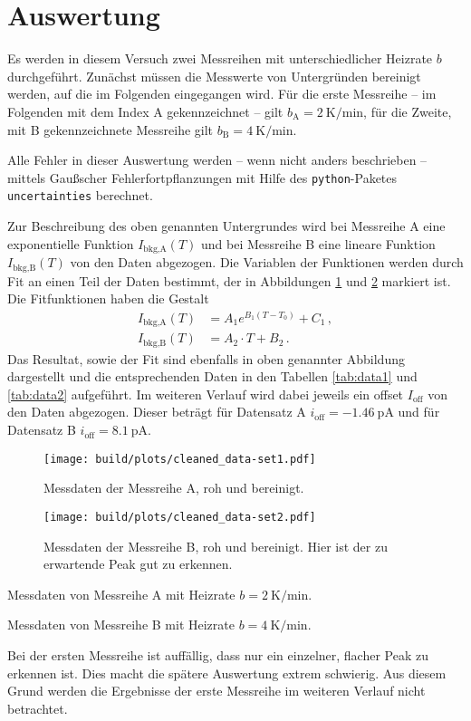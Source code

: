 \section{Auswertung}
\label{sec:auswertung}
Es werden in diesem Versuch zwei Messreihen mit unterschiedlicher Heizrate
$b$ durchgeführt. Zunächst müssen die Messwerte von Untergründen bereinigt
werden, auf die im Folgenden eingegangen wird.
Für die erste Messreihe -- im Folgenden mit dem Index A gekennzeichnet --
gilt $b_\text{A} = \SI{2}{\kelvin\per\minute}$, für die Zweite, mit B
gekennzeichnete Messreihe gilt $b_\text{B} = \SI{4}{\kelvin\per\minute}$.

Alle Fehler in dieser Auswertung werden -- wenn nicht anders beschrieben --
mittels Gaußscher Fehlerfortpflanzungen mit Hilfe des \texttt{python}-Paketes
\texttt{uncertainties} \cite{py-uncertainties} berechnet.

Zur Beschreibung des oben genannten Untergrundes wird bei Messreihe A eine
exponentielle Funktion $I_\text{bkg,A}(T)$ und bei Messreihe B eine lineare
Funktion
$I_\text{bkg,B}(T)$ von den Daten abgezogen. Die Variablen der Funktionen werden
durch Fit an einen Teil der Daten bestimmt, der in Abbildungen
\ref{fig:data-a} und \ref{fig:data-b} markiert ist.
Die Fitfunktionen haben die Gestalt
\begin{align*}
    I_\text{bkg,A}(T) &= A_1 e^{B_1 (T-T_0)} + C_1\,,\\
    I_\text{bkg,B}(T) &= A_2\cdot T + B_2\,.
\end{align*}
Das Resultat, sowie der Fit sind ebenfalls in oben genannter Abbildung
dargestellt und die entsprechenden Daten in den Tabellen \ref{tab:data1} und
\ref{tab:data2} aufgeführt.
Im weiteren Verlauf wird dabei jeweils ein offset $I_\text{off}$ von den Daten
abgezogen. Dieser beträgt für Datensatz A $i_\text{off} = \SI{-1.46}{\pico\ampere}$
und für Datensatz B $i_\text{off} = \SI{8.1}{\pico\ampere}$.
\begin{figure}
    \centering
    \texttt{[image: build/plots/cleaned\_data-set1.pdf]}
    \caption{Messdaten der Messreihe A, roh und bereinigt.}
    \label{fig:data-a}
\end{figure}
\begin{figure}
    \centering
    \texttt{[image: build/plots/cleaned\_data-set2.pdf]}
    \caption{Messdaten der Messreihe B, roh und bereinigt. Hier ist
    der zu erwartende Peak gut zu erkennen.}
    \label{fig:data-b}
\end{figure}
\begin{table}
    \centering
    \caption{Messdaten von Messreihe A mit Heizrate $b = \SI{2}{\kelvin\per\minute}$.}
    \label{tab:data1}
    
\end{table}
\begin{table}
    \centering
    \caption{Messdaten von Messreihe B mit Heizrate $b = \SI{4}{\kelvin\per\minute}$.}
    \label{tab:data2}
    
\end{table}
Bei der ersten Messreihe ist auffällig, dass nur ein einzelner, flacher Peak
zu erkennen ist. Dies macht die spätere Auswertung extrem schwierig.
Aus diesem Grund werden die Ergebnisse der erste Messreihe im weiteren
Verlauf nicht betrachtet.

